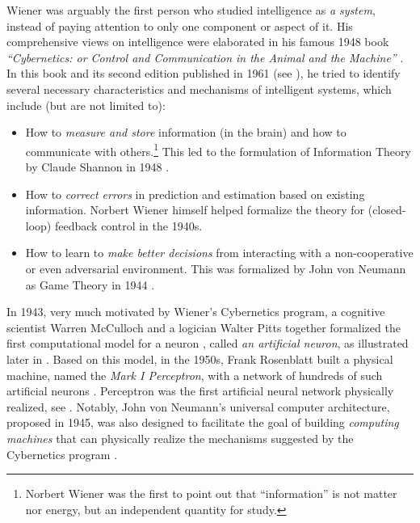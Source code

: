 \documentclass[../../book-main.tex]{subfiles}
\begin{document}
Wiener was arguably the first person who studied intelligence as {\em a system}, instead of paying attention to only one component or aspect of it. His comprehensive views on intelligence were elaborated in his famous 1948 book {\em ``Cybernetics: or Control and Communication in the Animal and the Machine''} \cite{Wiener-Cybernetics-1948}. In this book and its second edition published in 1961 \cite{Wiener-Cybernetics-1961} (see ), he tried to identify several necessary characteristics and mechanisms of intelligent systems, which include (but are not limited to):
\begin{itemize}
    \item How to {\em measure and store} information (in the brain) and how to communicate with others.\footnote{Norbert Wiener was the first to point out that ``information'' is not matter nor energy, but an independent quantity for study.} This led to the formulation of Information Theory by Claude Shannon in 1948 \cite{Shannon-1948}.
    \item How to {\em correct errors}  in prediction and estimation based on existing information. Norbert Wiener himself helped formalize the theory for (closed-loop) feedback control in the 1940s. 
    \item How to learn to {\em make better decisions} from interacting with a non-cooperative or even adversarial environment. This was formalized by John von Neumann as Game Theory in 1944 \cite{von-Neumann-1944}. 
\end{itemize}
In 1943, very much motivated by Wiener's Cybernetics program, a cognitive scientist Warren McCulloch and a logician Walter Pitts together formalized the first computational model for a neuron \cite{McCulloch-Pitts}, called {\em an artificial neuron}, as illustrated later in . Based on this model, in the 1950s, Frank Rosenblatt built a physical machine, named the {\em Mark I Perceptron}, with a network of hundreds of such artificial neurons \cite{Rosenblatt:1957}. Perceptron was the first artificial neural network physically realized, see . Notably, John von Neumann's universal computer architecture, proposed in 1945, was also designed to facilitate the goal of building {\em computing machines} that can physically realize the mechanisms suggested by the Cybernetics program \cite{von-Neumann-1958}. 
\end{document}
